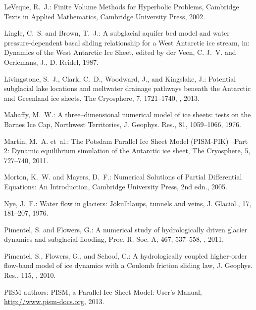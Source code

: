 \documentclass[gmd]{copernicus}   %
\begin{document}
\begin{thebibliography}{68}
LeVeque, R.~J.: Finite Volume Methods for Hyperbolic Problems, Cambridge Texts
  in Applied Mathematics, Cambridge University Press, 2002.

Lingle, C.~S. and Brown, T.~J.: A subglacial aquifer bed model and water
  pressure-dependent basal sliding relationship for a {W}est {A}ntarctic ice
  stream, in: Dynamics of the {W}est {A}ntarctic {I}ce {S}heet, edited by der
  Veen, C. J.~V. and Oerlemans, J., D. Reidel, 1987.

Livingstone, S.~J., Clark, C.~D., Woodward, J., and Kingslake, J.: Potential
  subglacial lake locations and meltwater drainage pathways beneath the
  {A}ntarctic and {G}reenland ice sheets, The Cryosphere, 7, 1721--1740,
  , 2013.

Mahaffy, M.~W.: A three--dimensional numerical model of ice sheets: tests on
  the {B}arnes {I}ce {C}ap, {N}orthwest {T}erritories, J. Geophys. Res., 81,
  1059--1066, 1976.

Martin, M.~A. et~al.: The {P}otsdam {P}arallel {I}ce {S}heet
  {M}odel ({PISM-PIK}) --{P}art 2: {D}ynamic equilibrium simulation of the
  {A}ntarctic ice sheet, The Cryosphere, 5, 727--740, 2011.

Morton, K.~W. and Mayers, D.~F.: Numerical {S}olutions of {P}artial
  {D}ifferential {E}quations: {A}n {I}ntroduction, Cambridge University Press,
  2nd edn., 2005.

Nye, J.~F.: Water flow in glaciers: {J}\"okulhlaups, tunnels and veins, J.
  Glaciol., 17, 181--207, 1976.

Pimentel, S. and Flowers, G.: A numerical study of hydrologically driven
  glacier dynamics and subglacial flooding, Proc. R. Soc. A, 467, 537--558,
  , 2011.

Pimentel, S., Flowers, G., and Schoof, C.: A hydrologically coupled
  higher-order flow-band model of ice dynamics with a {C}oulomb friction
  sliding law, J. Geophys. Res., 115, , 2010.

{PISM authors}: {PISM}, a {P}arallel {I}ce {S}heet {M}odel: {U}ser's {M}anual,
  \url{http://www.pism-docs.org}, 2013.


\end{thebibliography}
\end{document}
